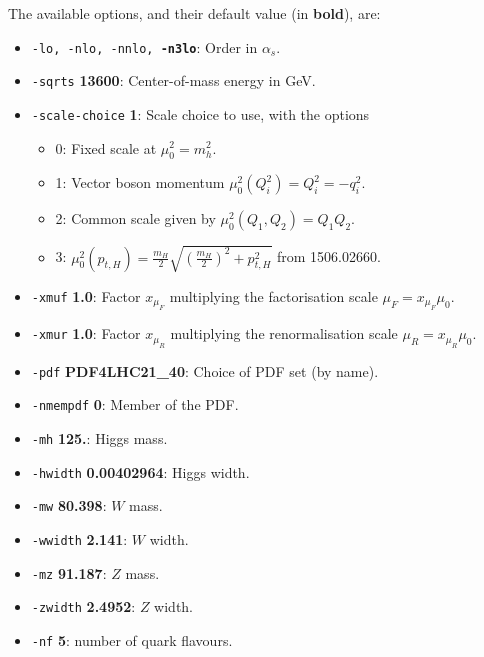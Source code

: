 \documentclass[12pt,a4]{article}
\begin{document}
The available options, and their default value (in {\bf bold}), are:
\begin{itemize}
\item\texttt{-lo, -nlo, -nnlo, {\bf -n3lo}}: Order in $\alpha_s$.
  
\item\texttt{-sqrts} {\bf 13600}: Center-of-mass energy in GeV.

\item\texttt{-scale-choice} {\bf 1}: Scale choice to use, with the options
  \begin{itemize}
  \item 0: Fixed scale at $\mu_0^2=m^2_h$.
  \item 1: Vector boson momentum $\mu_0^2(Q_i^2)=Q^2_i=-q_i^2$.
  \item 2: Common scale given by $\mu_0^2(Q_1, Q_2)=Q_1 Q_2$.
  \item 3: 
    $\mu_0^2(p_{t,H}) = \frac{m_H}{2} \sqrt{\left(\frac{m_H}{2}\right)^2
      + p_{t,H}^2}$ from 1506.02660.
  \end{itemize}

\item\texttt{-xmuf} {\bf 1.0}: Factor $x_{\mu_F}$ multiplying the
  factorisation scale $\mu_F = x_{\mu_F} \mu_0$.

\item\texttt{-xmur} {\bf 1.0}: Factor $x_{\mu_R}$ multiplying the
  renormalisation scale $\mu_R = x_{\mu_R} \mu_0$.

\item\texttt{-pdf} {\bf PDF4LHC21\_40}: Choice of PDF set (by name).

\item\texttt{-nmempdf} {\bf 0}: Member of the PDF.

\item\texttt{-mh} {\bf 125.}: Higgs mass.

\item\texttt{-hwidth} {\bf 0.00402964}: Higgs width.
  
\item\texttt{-mw} {\bf 80.398}: $W$ mass.

\item\texttt{-wwidth} {\bf 2.141}: $W$ width.

\item\texttt{-mz} {\bf 91.187}: $Z$ mass.

\item\texttt{-zwidth} {\bf 2.4952}: $Z$ width.

\item\texttt{-nf} {\bf 5}: number of quark flavours.
  

\end{itemize}
\end{document}
